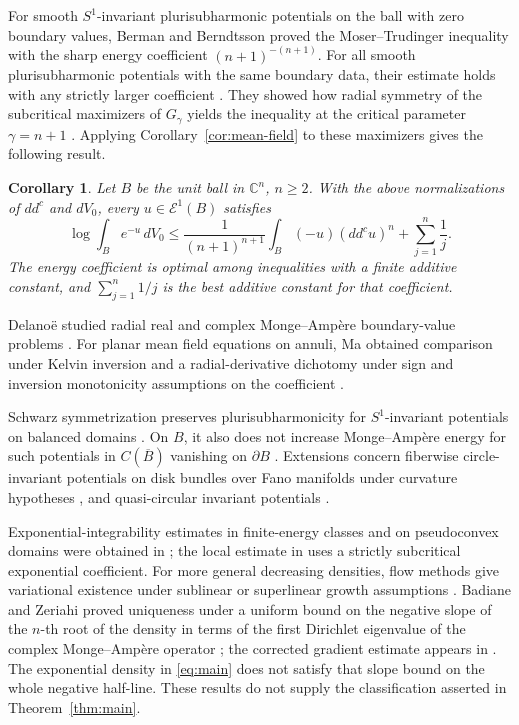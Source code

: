 \documentclass[11pt]{article}
\newtheorem{corollary}[theorem]{Corollary}
\newcommand{\C}{\mathbb C}
\begin{document}
For smooth $S^1$-invariant plurisubharmonic potentials on the ball
with zero boundary values, Berman and Berndtsson proved the
Moser--Trudinger inequality with the sharp energy coefficient
$(n+1)^{-(n+1)}$. For all smooth plurisubharmonic potentials with
the same boundary data, their estimate holds with any strictly
larger coefficient \cite[Theorems~1.4 and~1.5]{BB2022}. They
showed how radial symmetry of the subcritical maximizers of
$G_\gamma$ yields the inequality at the critical parameter
$\gamma=n+1$ \cite[Section~7.3]{BB2022}. Applying
Corollary~\ref{cor:mean-field} to these maximizers gives the
following result.

\begin{corollary}\label{cor:moser-trudinger}
Let $B$ be the unit ball in $\C^n$, $n\ge2$. With the above
normalizations of $dd^c$ and $dV_0$, every $u\in\mathcal E^1(B)$ satisfies
$$
 \log\int_B e^{-u}\,dV_0
 \le \frac{1}{(n+1)^{n+1}}\int_B(-u)(dd^cu)^n
     +\sum_{j=1}^n\frac1j.
$$
The energy coefficient is optimal among inequalities with a finite
additive constant, and $\sum_{j=1}^n 1/j$ is the best additive
constant for that coefficient.
\end{corollary}

Delano\"e studied radial real and complex Monge--Amp\`ere
boundary-value problems \cite{Delanoe1985}. For planar mean
field equations on annuli, Ma obtained comparison under Kelvin
inversion and a radial-derivative dichotomy under sign and
inversion monotonicity assumptions on the coefficient
\cite[Theorem~3]{Ma2009}.

Schwarz symmetrization preserves plurisubharmonicity for $S^1$-invariant
potentials on balanced domains \cite[Theorem~2.3]{BB2014}.
On $B$, it also does not increase Monge--Amp\`ere energy for
such potentials in $C(\overline B)$ vanishing on $\partial B$
\cite[Theorem~2.4]{BB2014}. Extensions concern fiberwise circle-invariant
potentials on disk bundles over Fano manifolds under curvature
hypotheses \cite{Wu2020}, and quasi-circular invariant
potentials \cite{DHZ2026}.

Exponential-integrability estimates in finite-energy classes
and on pseudoconvex domains were obtained in
\cite{AC2019,WWZ2020,DGL2021}; the local estimate in
\cite{DGL2021} uses a strictly subcritical exponential
coefficient. For more general decreasing densities, flow
methods give variational existence under sublinear or
superlinear growth assumptions \cite{CLMZ2026}.
Badiane and Zeriahi proved uniqueness under a uniform bound
on the negative slope of the $n$-th root of the density in
terms of the first Dirichlet eigenvalue of the complex Monge--Amp\`ere operator
\cite[Proposition~4.2]{BZ2023}; the corrected gradient estimate
appears in \cite{BLZ2026}. The exponential density in
\eqref{eq:main} does not satisfy that slope bound on the whole
negative half-line. These results do not supply the
classification asserted in Theorem~\ref{thm:main}.
\end{document}
